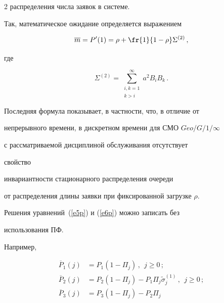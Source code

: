 \begin{multicols}{2}
распределения числа заявок в системе.


Так, математическое ожидание определяется выражением


\begin{equation}


\overline m =   P^\prime (1) = \rho + \fr{1}{ 1-\rho} \Sigma^{(2)}\,,


\label{e12p}


\end{equation}


где


\begin{equation}


\Sigma^{(2)} =  \sum^\infty_{\substack{{i,k=1}\\{k>i}}}


a^2 B_i B_k\,.


\label{e13p}


\end{equation}


Последняя формула показывает, в частности, что, в отличие от


непрерывного времени, в дискретном времени для СМО $Geo/G/1/\infty$


с рас\-смат\-ри\-ва\-е\-мой дисциплиной обслуживания отсутствует


 свойство


инвариантности стационарного распределения очереди


от распределения длины заявки при фиксированной загрузке $\rho$.





Решения уравнений~(\ref{e5p}) и (\ref{e6p}) можно записать без


использования ПФ.


Например,


\begin{align}


\overline P_{1}(j) &= P_1 \left ( 1 - \Pi_j\right )\,,


\ \ j\ge 0\,; \label{e14p}\\


\overline P_{2}(j) & = P_2 \left ( 1 - \Pi_j\right ) - P_1  \Pi_{j}


\widetilde \sigma_j^{(1)}\,,


\ \ j\ge 0\,; \label{e15p}\\


\overline P_{3}(j) & = P_3 \left ( 1 - \Pi_{j}\right ) - P_2 \Pi_{j}



\end{align}
\end{multicols}
